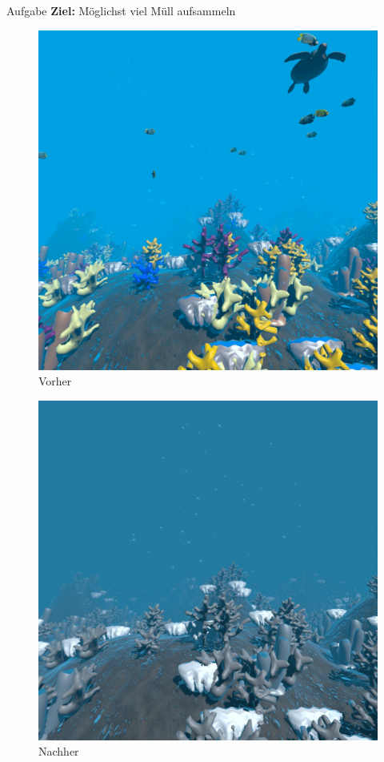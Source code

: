 \documentclass{beamer}
\begin{document}
\begin{frame}{Aufgabe}
\textbf{Ziel:} Möglichst viel Müll aufsammeln\\
\begin{minipage}[c]{0.49\textwidth}
\begin{figure}
\centering
\includegraphics[width=\textwidth, keepaspectratio]{img/Vorher_Bild}
\caption{Vorher}
\end{figure}
\end{minipage}
\hfill
\begin{minipage}[c]{0.49\textwidth}
\begin{figure}
\centering
\includegraphics[width=\textwidth, keepaspectratio]{img/Nachher_Bild}
\caption{Nachher}
\end{figure}
\end{minipage}
\end{frame}
\end{document}
